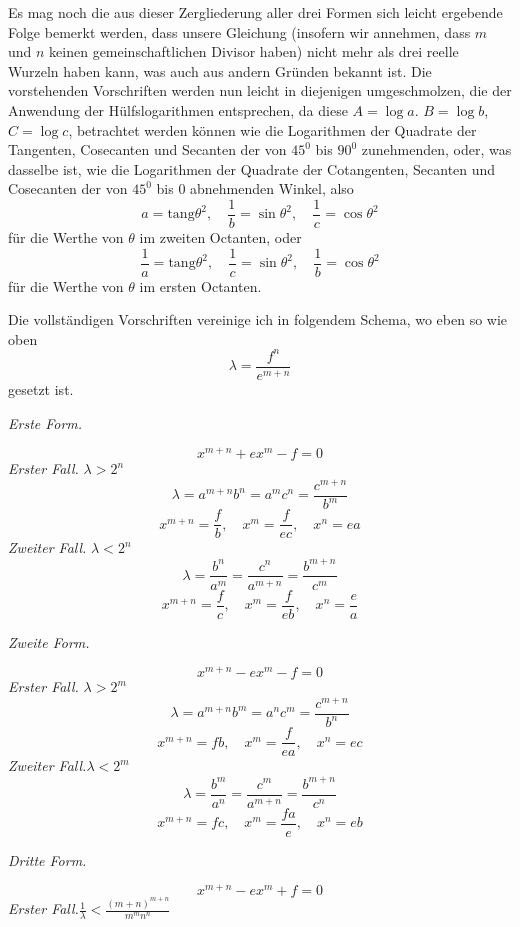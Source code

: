 Es mag noch die aus dieser Zergliederung aller drei Formen sich leicht ergebende Folge bemerkt werden, dass unsere Gleichung (insofern wir annehmen, dass
$m$ und $n$ keinen gemeinschaftlichen Divisor haben) nicht mehr als drei reelle
Wurzeln haben kann, was auch aus andern Gründen bekannt ist.
Die vorstehenden Vorschriften werden nun leicht in diejenigen umgeschmolzen, die der Anwendung der Hülfslogarithmen entsprechen, da diese $A=\log a$.
$B=\log b$, $C=\log c$, betrachtet werden können wie die Logarithmen der Quadrate der Tangenten, Cosecanten und Secanten der von $45^0$ bis $90^0$ zunehmenden, oder, was dasselbe ist, wie die Logarithmen der Quadrate der Cotangenten,
Secanten und Cosecanten der von $45^0$ bis $0$ abnehmenden Winkel, also
\[
a=\mathrm{tang}\theta^2,\quad \frac{1}{b}=\sin\theta^2,\quad
\frac{1}{c}=\cos\theta^2
\]
für die Werthe von $\theta$ im zweiten Octanten, oder
\[
\frac{1}{a}=\mathrm{tang}\theta^2,\quad
\frac{1}{c}=\sin\theta^2,\quad
\frac{1}{b}=\cos\theta^2
\]
für die Werthe von $\theta$ im ersten Octanten.

Die vollständigen Vorschriften vereinige ich in folgendem Schema, wo eben
so wie oben
\[
\lambda=\frac{f^n}{e^{m+n}}
\]
gesetzt ist.

\begin{center}\textit{Erste Form.}\end{center}
\[
x^{m+n}+ex^m-f=0
\]
\textit{Erster Fall.} $\lambda>2^n$
\[
\lambda=a^{m+n}b^n=a^m c^n=\frac{c^{m+n}}{b^m}
\]
\[
x^{m+n}=\frac{f}{b},\quad x^m=\frac{f}{ec},\quad x^n=ea
\]
\textit{Zweiter Fall.} $\lambda<2^n$
\[
\lambda=\frac{b^n}{a^m}=\frac{c^n}{a^{m+n}}=\frac{b^{m+n}}{c^m}
\]
\[
x^{m+n}=\frac{f}{c},\quad x^m=\frac{f}{eb},\quad x^n=\frac{e}{a}
\]

\begin{center}\textit{Zweite Form.}\end{center}
\[
x^{m+n}-ex^m-f=0
\]
\textit{Erster Fall.} $\lambda>2^m$
\[
\lambda=a^{m+n}b^m=a^nc^m=\frac{c^{m+n}}{b^n}
\]
\[
x^{m+n}=fb,\quad x^m=\frac{f}{ea},\quad x^n=ec
\]
\textit{Zweiter Fall.}\quad $\lambda<2^m$
\[
\lambda=\frac{b^m}{a^n}=\frac{c^m}{a^{m+n}}=\frac{b^{m+n}}{c^n}
\]
\[
x^{m+n}=fc,\quad x^m=\frac{fa}{e},\quad x^n=eb
\]
\begin{center}\textit{Dritte Form.}\end{center}
\[
x^{m+n}-ex^m+f=0
\]
\textit{Erster Fall.}\quad $\frac{1}{\lambda}<\frac{(m+n)^{m+n}}{m^mn^n}$

